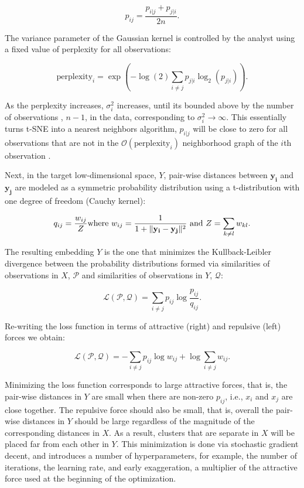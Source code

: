\documentclass[article,notitle]{jdssv}
\begin{document}
\[ p_{ij} = \frac{p_{i|j} + p_{j|i}}{2n}. \]

The variance parameter of the Gaussian kernel is controlled by the analyst
using a fixed value of perplexity for all observations:

\[ \text{perplexity}_i = \exp(-\log(2) \sum_{i \ne j}p_{j|i}\log_2(p_{j|i})).\]

As the perplexity increases, \(\sigma^2_{i}\) increases, until its bounded above
by the number of observations , \(n-1\), in the data, corresponding to
\(\sigma^2_{i} \rightarrow \infty\). This essentially turns t-SNE into a
nearest neighbors algorithm, \(p_{i|j}\) will be close to zero for all
observations that are not in the \(\mathcal{O}(\text{perplexity}_i)\)
neighborhood graph of the \(i\)th observation \citep{Van_Der_Maaten2014-zn}.

Next, in the target low-dimensional space, \(Y\), pair-wise distances between
\(\mathbf{y_i}\) and \(\mathbf{y_j}\) are modeled as a symmetric probability
distribution using a t-distribution with one degree of freedom (Cauchy kernel):

\[ q_{ij} = \frac{w_{ij}}{Z} \\ \text{where } w_{ij} = \frac{1}{ 1 + \lVert
\mathbf{y_i - y_j} \rVert ^ 2} \text{ and } Z = \sum_{k \ne l} w_{kl}. \]

The resulting embedding \(Y\) is the one that minimizes the Kullback-Leibler
divergence between the probability distributions formed via similarities of
observations in \(X\), \(\mathcal{P}\) and similarities of observations in \(Y\),
\(\mathcal{Q}\):

\[ \mathcal{L(\mathcal{P}, \mathcal{Q})} = \sum_{i \ne j} p_{ij} \log
\frac{p_{ij}}{q_{ij}}.\]

Re-writing the loss function in terms of attractive (right) and repulsive
(left) forces we obtain:

\[ \mathcal{L(\mathcal{P}, \mathcal{Q})} = -\sum_{i \ne j} p_{ij}\log w_{ij} +
\log\sum_{i \ne j} w_{ij}. \]

Minimizing the loss function corresponds to large attractive
forces, that is, the pair-wise distances in \(Y\) are small when there are
non-zero \(p_{ij}\), i.e., \(x_i\) and \(x_j\) are close together. The repulsive force
should also be small, that is, overall the
pair-wise distances in \(Y\) should be large regardless of the magnitude of the
corresponding distances in \(X\). As a result, clusters that are separate in \(X\)
will be placed far from each other in \(Y\).
This minimization is done via stochastic gradient decent,
and introduces a number of hyperparameters, for example, the number of iterations,
the learning rate, and early exaggeration, a multiplier of the attractive force
used at the beginning of the optimization.
\end{document}
